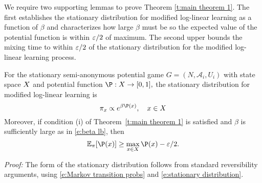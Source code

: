 We require two supporting lemmas to prove Theorem \ref{t:main theorem 1}.  The first  
establishes the stationary distribution for modified log-linear learning as a function of $\beta$ and characterizes how large $\beta$ must be so the expected value of the potential function is within $\varepsilon/2$ of maximum.  The second upper bounds the mixing time to within $\varepsilon/2$ of the stationary distribution for the modified log-linear learning process.  


\begin{lemma}\label{l:stationary distribution}\label{l:beta bound}
For the stationary semi-anonymous potential game $G = (N,\mathcal{A}_i,U_i)$  %
with state space $X$ and potential function $\P: \sX \to [0,1],$
the stationary distribution for modified log-linear learning is
\begin{equation}\label{e:stationary distribution}
\pi_{x}\propto e^{\beta\P(x)}, \quad x\in  \sX
\end{equation}
Moreover, if condition (i) of Theorem~\ref{t:main theorem 1} is satisfied and $\beta$ is sufficiently large as in \eqref{e:beta lb}, then \begin{equation}\label{e:expPot}
\E_\pi[\P(x)]\geq\max_{x\in \sX}\P(x)-\eps/2.
\end{equation}
\end{lemma}

\noindent\emph{Proof:}
The form of the stationary distribution follows from standard reversibility arguments, using \eqref{e:Markov transition probs} and \eqref{e:stationary distribution}.

